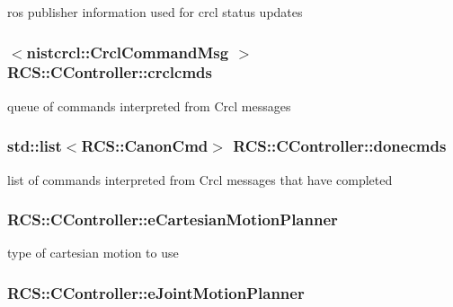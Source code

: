 ros publisher information used for crcl status updates \hypertarget{structRCS_1_1CController_a90aefbaf6e37b3902951d48365e6c6da}{
\subsubsection[{crclcmds}]{$<$nistcrcl\-::\-Crcl\-Command\-Msg $>$ R\-C\-S\-::\-C\-Controller\-::crclcmds}}\label{structRCS_1_1CController_a90aefbaf6e37b3902951d48365e6c6da}
queue of commands interpreted from Crcl messages \hypertarget{structRCS_1_1CController_a1801fcf66f2d28f00bf91f65634ae4df}{
\subsubsection[{donecmds}]{\setlength{\rightskip}{0pt plus 5cm}std\-::list$<${\bf R\-C\-S\-::\-Canon\-Cmd}$>$ R\-C\-S\-::\-C\-Controller\-::donecmds}}\label{structRCS_1_1CController_a1801fcf66f2d28f00bf91f65634ae4df}
list of commands interpreted from Crcl messages that have completed \hypertarget{structRCS_1_1CController_a4174fd5467045e780fe53bde42e70735}{
\subsubsection[{e\-Cartesian\-Motion\-Planner}]{ R\-C\-S\-::\-C\-Controller\-::e\-Cartesian\-Motion\-Planner}}\label{structRCS_1_1CController_a4174fd5467045e780fe53bde42e70735}
type of cartesian motion to use \hypertarget{structRCS_1_1CController_ad788d0def2101be74b680394bcbc78e7}{
\subsubsection[{e\-Joint\-Motion\-Planner}]{ R\-C\-S\-::\-C\-Controller\-::e\-Joint\-Motion\-Planner}}\label{structRCS_1_1CController_ad788d0def2101be74b680394bcbc78e7}
